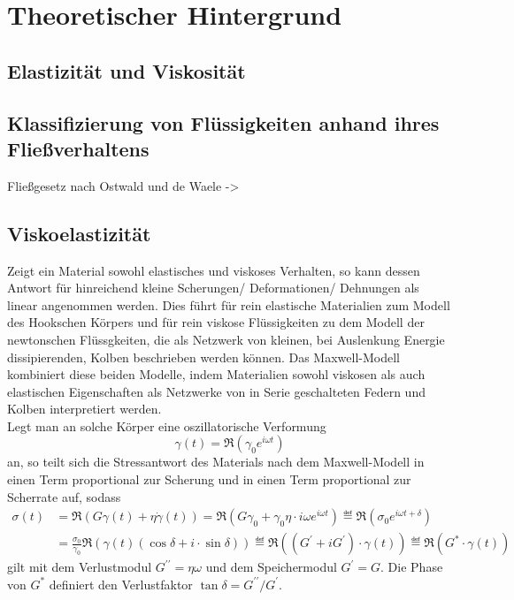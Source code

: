 \documentclass[11pt,a4paper,oneside]{scrartcl}
\begin{document}
\section{Theoretischer Hintergrund}
\subsection{Elastizität und Viskosität}
\subsection{Klassifizierung von Flüssigkeiten anhand ihres Fließverhaltens}
Fließgesetz nach Ostwald und de Waele ->\cite{dewiki:192899581}
\subsection{Viskoelastizität}
Zeigt ein Material sowohl elastisches und viskoses Verhalten, so kann dessen Antwort für hinreichend kleine Scherungen/ Deformationen/ Dehnungen als linear angenommen werden. Dies führt für rein elastische Materialien zum Modell des Hookschen Körpers und für rein viskose Flüssigkeiten zu dem Modell der newtonschen Flüssgkeiten, die als Netzwerk von kleinen, bei Auslenkung Energie dissipierenden, Kolben beschrieben werden können. Das Maxwell-Modell kombiniert diese beiden Modelle, indem Materialien sowohl viskosen als auch elastischen Eigenschaften als Netzwerke von in  Serie geschalteten Federn und Kolben interpretiert werden.\\
Legt man an solche Körper eine oszillatorische Verformung 
\begin{equation}
\gamma(t)=\Re\left(\gamma_0 e^{i\omega t}\right)
\end{equation}
an, so teilt sich die Stressantwort des Materials nach dem Maxwell-Modell in einen Term proportional zur Scherung und in einen Term proportional zur Scherrate auf, sodass
\begin{align}
\sigma(t)&=\Re\left(G\gamma(t)+\eta\dot\gamma(t)\right)=\Re\left(G\gamma_0+\gamma_0\eta\cdot i\omega  e^{i\omega t}\right)\eqdef \Re\left(\sigma_0 e^{i\omega t+\delta} \right)\\
\quad& =\frac{\sigma_0}{\gamma_0}\Re\left(\gamma(t)(\cos\delta+i\cdot\sin\delta)\right)\eqdef\Re\left( (G^\prime+iG^\prime)\cdot\gamma(t)\right)\eqdef \Re\left(G^*\cdot\gamma(t)\right)
\end{align}
gilt mit dem Verlustmodul $G^{\prime\prime}=\eta\omega$ und dem Speichermodul $G^\prime=G$. Die Phase von $G^*$ definiert den Verlustfaktor $\tan\delta = G^{\prime\prime}/G^{\prime}$.\\
\end{document}
